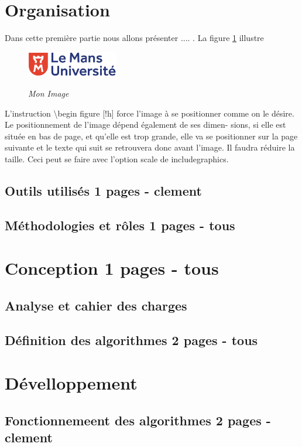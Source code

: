\documentclass[10pt]{article}
\begin{document}
\section{Organisation }   
Dans cette première partie nous allons présenter .... . La figure \ref{fig1} illustre
\begin{figure}[h]
   \begin{center}
      \includegraphics[width=4cm]{logolemansU.png}\\
      \caption{{\emph{Mon Image}}}
      \label{fig1}
   \end{center}
\end{figure}


L’instruction \textbackslash begin figure [!h] force l’image à se positionner comme
on le désire. Le positionnement de l’image dépend également de ses dimen-
sions, si elle est située en bas de page, et qu’elle est trop grande, elle va se
positionner sur la page suivante et le texte qui suit se retrouvera donc avant
l’image. Il faudra réduire la taille. Ceci peut se faire avec l’option scale de
includegraphics.
      \subsection{Outils utilisés 1 pages - clement}
      \subsection{Méthodologies et rôles 1 pages - tous}

\section{Conception 1 pages - tous}
   \subsection{Analyse et cahier des charges}
   \subsection{Définition des algorithmes 2 pages - tous}

\section{Dévelloppement}
   \subsection{Fonctionnemeent des algorithmes 2 pages - clement}
\end{document}
